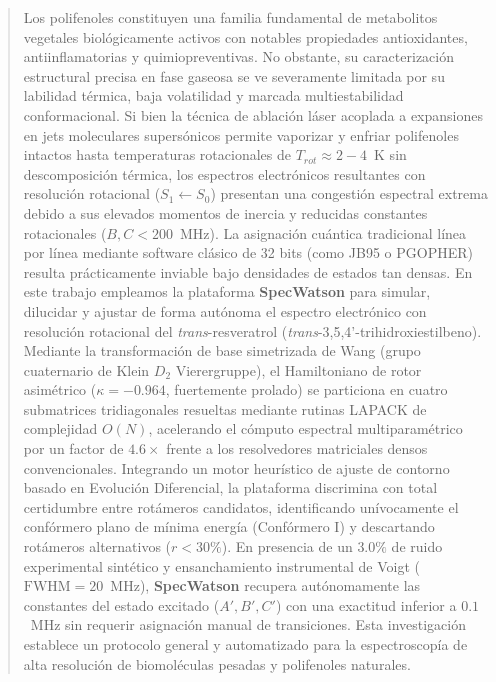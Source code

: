 \documentclass[aps,jcp,reprint,twocolumn,superscriptaddress,showpacs,amsmath,amssymb]{revtex4-2}
\begin{document}
\begin{abstract}
Los polifenoles constituyen una familia fundamental de metabolitos vegetales biol\'ogicamente activos con notables propiedades antioxidantes, antiinflamatorias y quimiopreventivas. No obstante, su caracterizaci\'on estructural precisa en fase gaseosa se ve severamente limitada por su labilidad t\'ermica, baja volatilidad y marcada multiestabilidad conformacional. Si bien la t\'ecnica de ablaci\'on l\'aser acoplada a expansiones en jets moleculares supers\'onicos permite vaporizar y enfriar polifenoles intactos hasta temperaturas rotacionales de $T_{rot} \approx 2 - 4$~K sin descomposici\'on t\'ermica, los espectros electr\'onicos resultantes con resoluci\'on rotacional ($S_1 \leftarrow S_0$) presentan una congesti\'on espectral extrema debido a sus elevados momentos de inercia y reducidas constantes rotacionales ($B, C < 200$~MHz). La asignaci\'on cu\'antica tradicional l\'inea por l\'inea mediante software cl\'asico de 32 bits (como JB95 o PGOPHER) resulta pr\'acticamente inviable bajo densidades de estados tan densas. En este trabajo empleamos la plataforma \textbf{SpecWatson} para simular, dilucidar y ajustar de forma aut\'onoma el espectro electr\'onico con resoluci\'on rotacional del \textit{trans}-resveratrol (\textit{trans}-3,5,4'-trihidroxiestilbeno). Mediante la transformaci\'on de base simetrizada de Wang (grupo cuaternario de Klein $D_2$ Vierergruppe), el Hamiltoniano de rotor asim\'etrico ($\kappa = -0.964$, fuertemente prolado) se particiona en cuatro submatrices tridiagonales resueltas mediante rutinas LAPACK de complejidad $O(N)$, acelerando el c\'omputo espectral multiparam\'etrico por un factor de $4.6\times$ frente a los resolvedores matriciales densos convencionales. Integrando un motor heur\'istico de ajuste de contorno basado en Evoluci\'on Diferencial, la plataforma discrimina con total certidumbre entre rot\'ameros candidatos, identificando un\'ivocamente el conf\'ormero plano de m\'inima energ\'ia (Conf\'ormero I) y descartando rot\'ameros alternativos ($r < 30\%$). En presencia de un $3.0\%$ de ruido experimental sint\'etico y ensanchamiento instrumental de Voigt ($\text{FWHM} = 20$~MHz), \textbf{SpecWatson} recupera aut\'onomamente las constantes del estado excitado ($A', B', C'$) con una exactitud inferior a $0.1$~MHz sin requerir asignaci\'on manual de transiciones. Esta investigaci\'on establece un protocolo general y automatizado para la espectroscop\'ia de alta resoluci\'on de biomol\'eculas pesadas y polifenoles naturales.
\end{abstract}

\maketitle
\end{document}
